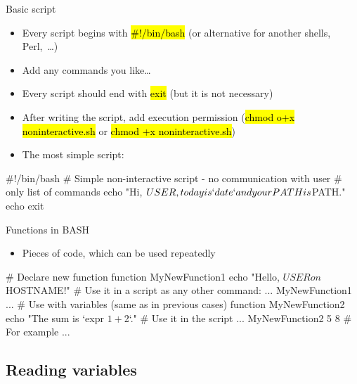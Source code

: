 \documentclass[compress, ucs, xelatex, 11pt, xcolor=svgnames,
  hyperref={
    bookmarks=true,
    unicode=true,
    colorlinks=true,
    pdftitle={Linux, command line and MetaCentrum},
    plainpages=false,
    pdfauthor={Vojtech Zeisek},
    pdfsubject={Course about use of Linux command line, writing shell scripts and using MetaCentrum of CESNET},
    pdfcreator={XeLaTeX},
    pdfkeywords={Linux, GNU, BASH, shell, command line, MetaCentrum},
    linkcolor=DarkRed,
    anchorcolor=DarkBlue,
    citecolor=Indigo,
    filecolor=NavyBlue,
    menucolor=DarkMagenta,
    urlcolor=DarkBlue,
    pdftex},
  url={hyphens, lowtilde} %
  ]{beamer}
\renewcommand{\texttt}[1]{\hl{\ttfamily #1}}
\begin{document}
\begin{frame}[fragile]{Basic script}
\begin{itemize}
 \item Every script begins with \texttt{\#!/bin/bash} (or alternative for another shells, Perl,~\ldots)
 \item Add any commands you like\ldots
 \item Every script should end with \texttt{exit} (but it is not necessary)
 \item After writing the script, add execution permission (\texttt{chmod o+x noninteractive.sh} or \texttt{chmod +x noninteractive.sh})
 \item The most simple script:
\end{itemize}
  \begin{bashcode}
    #!/bin/bash
    # Simple non-interactive script - no communication with user
    # only list of commands
    echo "Hi, $USER, today is `date` and your PATH is $PATH."
    echo
    exit
  \end{bashcode}
\end{frame}

\begin{frame}[fragile]{Functions in BASH}
  \begin{itemize}
    \item Pieces of code, which can be used repeatedly
  \end{itemize}
  \begin{bashcode}
    # Declare new function
    function MyNewFunction1 {
      echo "Hello, $USER on $HOSTNAME!"
      }
    # Use it in a script as any other command:
    ...
    MyNewFunction1
    ...
    # Use with variables (same as in previous cases)
    function MyNewFunction2 {
      echo "The sum is `expr $1 + $2`."
      }
    # Use it in the script
    ...
    MyNewFunction2 5 8 # For example
    ...
  \end{bashcode}
\end{frame}

\subsection{Reading variables}
\end{document}
